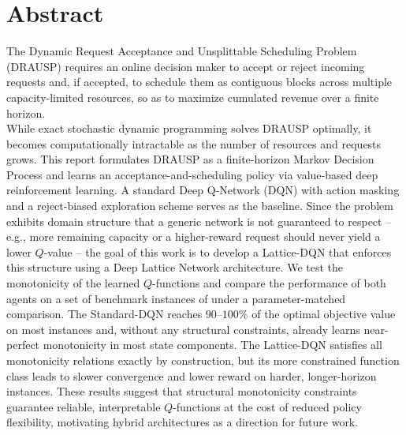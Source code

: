 \section*{Abstract}
\thispagestyle{empty}
The Dynamic Request Acceptance and Unsplittable Scheduling Problem (DRAUSP) requires an online decision maker to accept or reject incoming requests and, if accepted, to schedule them as contiguous blocks across multiple capacity-limited resources, so as to maximize cumulated revenue over a finite horizon. \\
While exact stochastic dynamic programming solves DRAUSP optimally, it becomes computationally intractable as the number of resources and requests grows. This report formulates DRAUSP as a finite-horizon Markov Decision Process and learns an acceptance-and-scheduling policy via value-based deep reinforcement learning. A standard Deep Q-Network (DQN) with action masking and a reject-biased exploration scheme serves as the baseline. Since the problem exhibits domain structure that a generic network is not guaranteed to respect -- e.g., more remaining capacity or a higher-reward request should never yield a lower $Q$-value -- the goal of this work is to develop a Lattice-DQN that enforces this structure using a Deep Lattice Network architecture. We test the monotonicity of the learned $Q$-functions and compare the performance of both agents on a set of benchmark instances of \textcite{drausp_lion18} under a parameter-matched comparison. The Standard-DQN reaches $90$--$100\%$ of the optimal objective value on most instances and, without any structural constraints, already learns near-perfect monotonicity in most state components. The Lattice-DQN satisfies all monotonicity relations exactly by construction, but its more constrained function class leads to slower convergence and lower reward on harder, longer-horizon instances. These results suggest that structural monotonicity constraints guarantee reliable, interpretable $Q$-functions at the cost of reduced policy flexibility, motivating hybrid architectures as a direction for future work.

\clearpage
